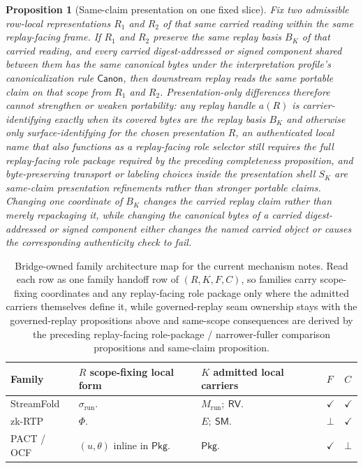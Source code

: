 \documentclass[11pt]{article}
\newtheorem{proposition}{Proposition}
\newcommand{\Canon}{\mathsf{Canon}}
\begin{document}
\begin{proposition}[Same-claim presentation on one fixed slice]
Fix two admissible row-local representations $R_1$ and $R_2$ of that same carried reading within the same replay-facing frame.
If $R_1$ and $R_2$ preserve the same replay basis $B_K$ of that carried reading, and every carried digest-addressed or signed component shared between them has the same canonical bytes under the interpretation profile's canonicalization rule $\Canon$, then downstream replay reads the same portable claim on that scope from $R_1$ and $R_2$.
Presentation-only differences therefore cannot strengthen or weaken portability: any replay handle $a(R)$ is carrier-identifying exactly when its covered bytes are the replay basis $B_K$ and otherwise only surface-identifying for the chosen presentation $R$, an authenticated local name that also functions as a replay-facing role selector still requires the full replay-facing role package required by the preceding completeness proposition, and byte-preserving transport or labeling choices inside the presentation shell $S_K$ are same-claim presentation refinements rather than stronger portable claims.
Changing one coordinate of $B_K$ changes the carried replay claim rather than merely repackaging it, while changing the canonical bytes of a carried digest-addressed or signed component either changes the named carried object or causes the corresponding authenticity check to fail.
\end{proposition}

\begin{table}[b]
\centering
\small
\begin{tabular}{@{}p{}p{}p{}p{}p{}@{}}
\toprule
Family & $R$ scope-fixing local form & $K$ admitted local carriers & $F$ & $C$ \\
\midrule
StreamFold & $\sigma_{\mathrm{run}}$. & $M_{\mathrm{run}};\ \mathsf{RV}$. & $\checkmark$ & $\checkmark$ \\
zk-RTP & $\Phi$. & $E;\ \mathsf{SM}$. & $\bot$ & $\checkmark$ \\
PACT / OCF & $(u,\theta)$ inline in $\mathsf{Pkg}$. & $\mathsf{Pkg}$. & $\checkmark$ & $\bot$ \\
\bottomrule
\end{tabular}
\caption{Bridge-owned family architecture map for the current mechanism notes. Read each row as one family handoff row of $(R,K,F,C)$, so families carry scope-fixing coordinates and any replay-facing role package only where the admitted carriers themselves define it, while governed-replay seam ownership stays with the governed-replay propositions above and same-scope consequences are derived by the preceding replay-facing role-package / narrower-fuller comparison propositions and same-claim proposition.}
\label{tab:family-architecture-map}
\end{table}
\end{document}
